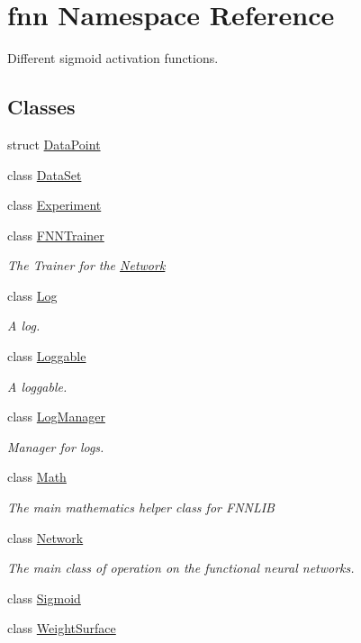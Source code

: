 \hypertarget{namespacefnn}{}\section{fnn Namespace Reference}
\label{namespacefnn}


Different sigmoid activation functions.  


\subsection*{Classes}
\begin{DoxyCompactItemize}
\item 
struct \hyperlink{structfnn_1_1_data_point}{Data\+Point}
\item 
class \hyperlink{classfnn_1_1_data_set}{Data\+Set}
\item 
class \hyperlink{classfnn_1_1_experiment}{Experiment}
\item 
class \hyperlink{classfnn_1_1_f_n_n_trainer}{F\+N\+N\+Trainer}
\begin{DoxyCompactList}\small\item\em The Trainer for the \hyperlink{classfnn_1_1_network}{Network} \end{DoxyCompactList}\item 
class \hyperlink{classfnn_1_1_log}{Log}
\begin{DoxyCompactList}\small\item\em A log. \end{DoxyCompactList}\item 
class \hyperlink{classfnn_1_1_loggable}{Loggable}
\begin{DoxyCompactList}\small\item\em A loggable. \end{DoxyCompactList}\item 
class \hyperlink{classfnn_1_1_log_manager}{Log\+Manager}
\begin{DoxyCompactList}\small\item\em Manager for logs. \end{DoxyCompactList}\item 
class \hyperlink{classfnn_1_1_math}{Math}
\begin{DoxyCompactList}\small\item\em The main mathematics helper class for F\+N\+N\+L\+I\+B \end{DoxyCompactList}\item 
class \hyperlink{classfnn_1_1_network}{Network}
\begin{DoxyCompactList}\small\item\em The main class of operation on the functional neural networks. \end{DoxyCompactList}\item 
class \hyperlink{classfnn_1_1_sigmoid}{Sigmoid}
\item 
class \hyperlink{classfnn_1_1_weight_surface}{Weight\+Surface}
\end{DoxyCompactItemize}



